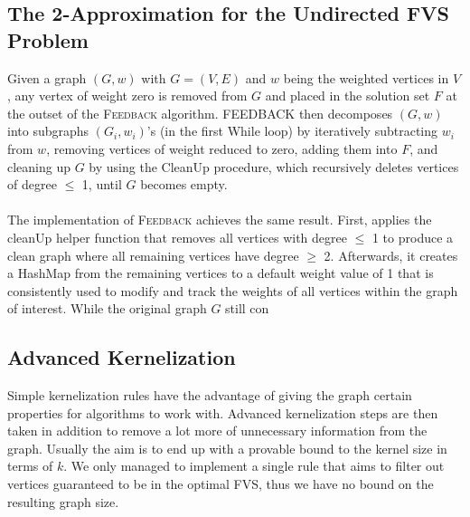 \subsection{The 2-Approximation for the Undirected FVS Problem}%
\label{sec:2approx}
Given a graph $(G, w)$ with $G = (V,E)$ and $w$ being the weighted vertices in $V$, any vertex of weight zero is removed from $G$ and placed in the solution set $F$ at the outset of the \textsc{Feedback} algorithm. \textsc{FEEDBACK} then decomposes $(G, w)$ into subgraphs $(G_i, w_i)$’s (in the first While loop) by iteratively subtracting $w_i$ from $w$, removing vertices of weight reduced to zero, adding them into $F$, and cleaning up $G$ by using the CleanUp procedure, which recursively deletes vertices of degree $\leq$ 1, until $G$ becomes empty.\\\\
The implementation of \textsc{Feedback} achieves the same result. First, applies the cleanUp helper function that removes all vertices with degree $\leq$ 1 to produce a clean graph where all remaining vertices have degree $\geq$ 2. Afterwards, it creates a HashMap from the remaining vertices to a default weight value of 1 that is consistently used to modify and track the weights of all vertices within the graph of interest. While the original graph $G$ still con %

\subsection{Advanced Kernelization}%
Simple kernelization rules have the advantage of giving the graph certain properties for algorithms to work with. Advanced kernelization steps are then taken in addition to remove a lot more of unnecessary information from the graph. Usually the aim is to end up with a provable bound to the kernel size in terms of $k$. We only managed to implement a single rule that aims to filter out vertices guaranteed to be in the optimal FVS, thus we have no bound on the resulting graph size. 
